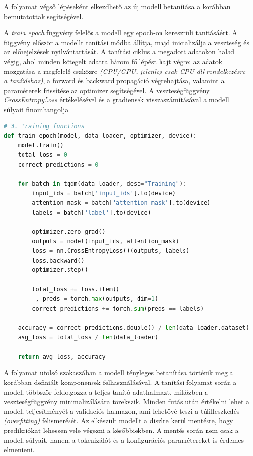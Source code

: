 \documentclass[12pt]{article}
\begin{document}
A folyamat végső lépéseként elkezdhető az új modell betanítása a korábban bemutatottak segítségével.

A \textit{train epoch} függvény felelős a modell egy epoch-on keresztüli tanításáért. A függvény először a modellt tanítási módba állítja, majd inicializálja a veszteség és az előrejelzések nyilvántartását. A tanítási ciklus a megadott adatokon halad végig, ahol minden kötegelt adatra három fő lépést hajt végre: az adatok mozgatása a megfelelő eszközre \textit{(CPU/GPU, jelenleg csak CPU áll rendelkezésre a tanításhoz)}, a forward és backward propagáció végrehajtása, valamint a paraméterek frissítése az optimizer segítségével. A veszteségfüggvény \textit{CrossEntropyLoss} értékelésével és a gradiensek visszaszámításával a modell súlyait finomhangolja.

\begin{lstlisting}[language=Python,caption=Tanítási folyamat]
# 3. Training functions
def train_epoch(model, data_loader, optimizer, device):
    model.train()
    total_loss = 0
    correct_predictions = 0

    for batch in tqdm(data_loader, desc="Training"):
        input_ids = batch['input_ids'].to(device)
        attention_mask = batch['attention_mask'].to(device)
        labels = batch['label'].to(device)

        optimizer.zero_grad()
        outputs = model(input_ids, attention_mask)
        loss = nn.CrossEntropyLoss()(outputs, labels)
        loss.backward()
        optimizer.step()

        total_loss += loss.item()
        _, preds = torch.max(outputs, dim=1)
        correct_predictions += torch.sum(preds == labels)

    accuracy = correct_predictions.double() / len(data_loader.dataset)
    avg_loss = total_loss / len(data_loader)

    return avg_loss, accuracy
\end{lstlisting}

A folyamat utolsó szakaszában a modell tényleges betanítása történik meg a korábban definiált komponensek felhasználásával. A tanítási folyamat során a modell többször feldolgozza a teljes tanító adathalmazt, miközben a veszteségfüggvény minimalizálására törekszik. Minden futás után értékelni lehet a modell teljesítményét a validációs halmazon, ami lehetővé teszi a túlilleszkedés \textit{(overfitting)} felismerését. Az elkészült modellt a diszlre kerül mentésre, hogy predikciókat lehessen vele végezni a későbbiekben. A mentés során nem csak a modell súlyait, hanem a tokenizálót és a konfigurációs paramétereket is érdemes elmenteni.
\end{document}
